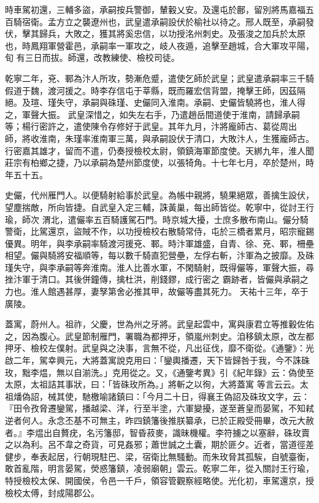 \begin{pinyinscope}
 時車駕初還，三輔多盜，承嗣按兵警御，輦轂乂安。及還屯於鄜，留別將馬嘉福五百騎宿衛。孟方立之襲遼州也，武皇遣承嗣設伏於榆社以待之。邢人既至，承嗣發伏，擊其歸兵，大敗之，獲其將奚忠信，以功授洺州刺史。及張浚之加兵於太原也，時鳳翔軍營霍邑，承嗣率一軍攻之，岐人夜遁，追擊至趙城，合大軍攻平陽，旬
 有三日而拔。師還，改教練使、檢校司徒。


乾寧二年，兗、鄆為汴人所攻，勢漸危蹙，遣使乞師於武皇；武皇遣承嗣率三千騎假道于魏，渡河援之。時李存信屯于莘縣，既而羅宏信背盟，掩擊王師，因茲隔絕。及瑄、瑾失守，承嗣與硃瑾、史儼同入淮南。承嗣、史儼皆驍將也，淮人得之，軍聲大振。
 武皇深惜之，如失左右手，乃遣趙岳間道使于淮南，請歸承嗣等；楊行密許之，遣使陳令存修好于武皇。其年九月，汴將龐師古、葛從周出
 師，將收淮南，朱瑾率淮南軍三萬，與承嗣設伏于清口，大敗汴人，生獲龐師古。行密嘉其雄才，留而不遣，仍奏授檢校太尉，領鎮海軍節度使。天綁九年，淮人聞莊宗有柏鄉之捷，乃以承嗣為楚州節度使，以張犄角。十七年七月，卒於楚州，時年五十五。


史儼，代州雁門人。以便騎射給事於武皇。為帳中親將，驍果絕眾，善擒生設伏，望塵揣敵，所向皆捷。自武皇入定三輔，誅黃巢，每出師皆從。乾寧中，從討王行瑜，師次
 渭北，遣儼率五百騎護駕石門。時京城大擾，士庶多散布南山。儼分騎警衛，比駕還京，盜賊不作，以功授檢校右散騎常侍，屯於三橋者累月，昭宗寵錫優異。明年，與李承嗣率騎渡河援兗、鄆。時汴軍雄盛，自青、徐、兗、鄆，柵壘相望。儼與騎將安福順等，每以數千騎直犯營壘，左俘右斬，汴軍為之披靡。及硃瑾失守，與李承嗣等奔淮南。淮人比善水軍，不閑騎射，既得儼等，軍聲大振，尋挫汴軍于清口。其後併鐘傳，擒杜洪，削錢鏐，成行密之
 霸跡者，皆儼與承嗣之力也。淮人館遇甚厚，妻孥第舍必推其甲，故儼等盡其死力。
 天祐十三年，卒于廣陵。



 蓋寓，蔚州人。祖祚，父慶，世為州之牙將。武皇起雲中，寓與康君立等推轂佐佑之，因為腹心。武皇節制雁門，署職為都押牙，領嵐州刺史。洎移鎮太原，改左都押牙、檢校左僕射。武皇與之決事，言無不從，凡出征伐，靡不衛從。《通鑒》：光啟二年，駕幸興元，大將蓋寓說克用曰：「鑾輿播遷，天下皆歸咎于我，今不誅硃玫，黜李煴，無以自湔洗。」克用從之。又，《通鑒考異》引《紀年錄》云：偽使至太原，太祖詰其事狀，曰：「皆硃玫所為。」將斬之以徇，大將蓋寓
 等言云云。太祖燔偽詔，械其使，馳檄喻諸鎮曰：「今月二十日，得襄王偽詔及硃玫文字，云：『田令孜脅遷鑾駕，播越梁、洋，行至半塗，六軍變擾，遂至蒼皇而晏駕，不知弒逆者何人。永念丕基不可無主，昨四鎮籓後推朕纂承，已於正殿受冊畢，改元大赦者。』李煴出自贅疣，名污籓邸，智昏菽麥，識昧機權。李符擄之以塞辭，硃玫賣之以為利。呂不韋之奇貨，可見姦邪；蕭世誠之土囊，期於匪夕。近者，當道徑差健步，奉表起居，行朝現駐巴、梁，宿衛比無騷動。而朱玫脅其孤騃，自號臺衡，敢首亂階，明言晏駕，熒惑籓鎮，凌弱廟朝」雲云。乾寧二年，從入關討王行瑜，特授檢校太保、開國侯，令邑一千戶，領容管觀察經略使。光化初，車駕還京，授檢校太傅，封成陽郡公。




\end{pinyinscope}
